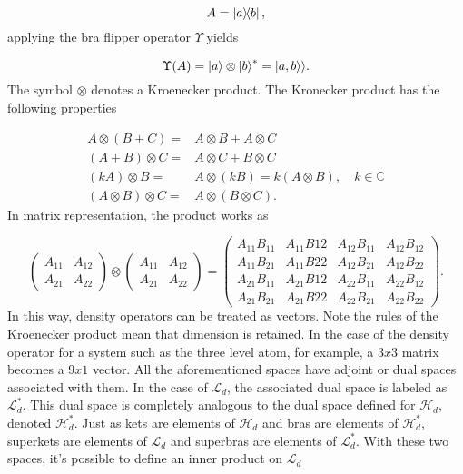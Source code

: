 \documentclass[12pt]{article}
\newcommand{\superket}[1]{|#1\rangle\rangle}
\begin{document}
\begin{equation}
    A = \ketbra{a}{b},
\end{equation} applying the bra flipper operator $\Upsilon$ yields

\begin{equation}
    \Upsilon(A) = \ket{a} \otimes \ket{b}^* =\superket{a,b}.
\end{equation} The symbol $\otimes$ denotes a Kroenecker product. The Kronecker product has the following properties \cite{FernandezKronecker2016}

\begin{align*}
    A \otimes (B+C) =& A \otimes B + A \otimes C\\
    (A+B) \otimes C =& A \otimes C + B \otimes C\\
    (kA)\otimes B =& A\otimes (kB) = k(A \otimes B), \quad k \in \mathbb{C}\\
    (A \otimes B) \otimes C =& A \otimes (B \otimes C).
\end{align*} In matrix representation, the product works as

\begin{equation}
\begin{pmatrix}
A_{11} & A_{12} \\
A_{21} & A_{22}
\end{pmatrix}
\otimes
\begin{pmatrix}
A_{11} & A_{12} \\
A_{21} & A_{22}
\end{pmatrix} =
\begin{pmatrix}
A_{11} B_{11} & A_{11} B{12} & A_{12} B_{11} & A_{12} B_{12} \\
A_{11} B_{21} & A_{11} B{22} & A_{12} B_{21} & A_{12} B_{22} \\
A_{21} B_{11} & A_{21} B{12} & A_{22} B_{11} & A_{22} B_{12} \\
A_{21} B_{21} & A_{21} B{22} & A_{22} B_{21} & A_{22} B_{22}
\end{pmatrix}.
\end{equation}
In this way, density operators can be treated as vectors. Note the rules of the Kroenecker product mean that dimension is retained. In the case of the density operator for a system such as the three level atom, for example, a $3x3$ matrix becomes a $9x1$ vector. All the aforementioned spaces have adjoint or dual spaces associated with them. In the case of $\mathcal{L}_d$, the associated dual space is labeled as $\mathcal{L}^*_d$. This dual space is completely analogous to the dual space defined for $\mathcal{H}_d$, denoted $\mathcal{H}^*_d$. Just as kets are elements of $\mathcal{H}_d$ and bras are elements of  $\mathcal{H}^*_d$, superkets are elements of $\mathcal{L}_d$ and superbras are elements of $\mathcal{L}^*_d$. With these two spaces, it's possible to define an inner product on $\mathcal{L}_d$
\end{document}
